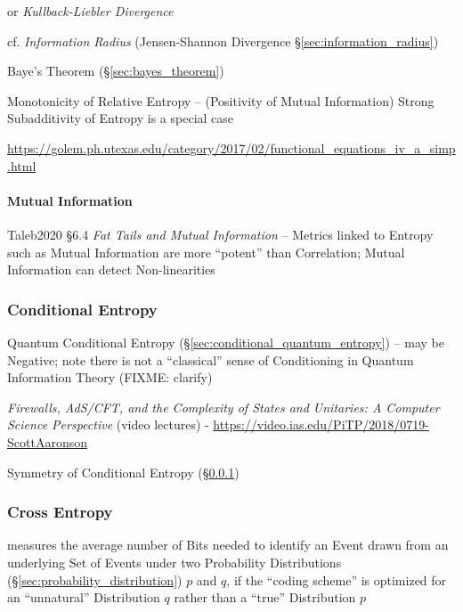 or \emph{Kullback-Liebler Divergence}

cf. \emph{Information Radius} (Jensen-Shannon Divergence
\S\ref{sec:information_radius})

\fist Baye's Theorem (\S\ref{sec:bayes_theorem})

Monotonicity of Relative Entropy -- (Positivity of Mutual Information) Strong
Subadditivity of Entropy is a special case

\url{https://golem.ph.utexas.edu/category/2017/02/functional_equations_iv_a_simp.html}



\paragraph{Mutual Information}\label{sec:mutual_information}\hfill

Taleb2020 \S 6.4 \emph{Fat Tails and Mutual Information} -- Metrics linked to
Entropy such as Mutual Information are more ``potent'' than Correlation; Mutual
Information can detect Non-linearities



\subsubsection{Conditional Entropy}\label{sec:conditional_entropy}

\fist Quantum Conditional Entropy (\S\ref{sec:conditional_quantum_entropy}) --
may be Negative; note there is not a ``classical'' sense of Conditioning in
Quantum Information Theory (FIXME: clarify)

\asterism

\emph{Firewalls, AdS/CFT, and the Complexity of States and Unitaries: A Computer
  Science Perspective}
(video lectures)
-
\url{https://video.ias.edu/PiTP/2018/0719-ScottAaronson}

Symmetry of Conditional Entropy (\S\ref{sec:conditional_entropy})



\subsubsection{Cross Entropy}\label{sec:cross_entropy}

measures the average number of Bits needed to identify an Event drawn from an
underlying Set of Events under two Probability Distributions
(\S\ref{sec:probability_distribution}) $p$ and $q$, if the ``coding scheme'' is
optimized for an ``unnatural'' Distribution $q$ rather than a ``true''
Distribution $p$

